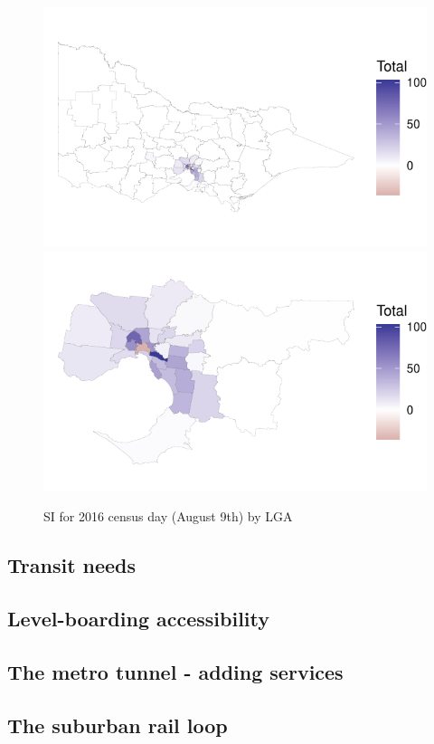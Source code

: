 \documentclass[]{tufte-book}
\begin{document}
\begin{figure}
\includegraphics[width=0.5\linewidth]{Reynolds_Currie_2024_transit_supply_index_GTFS_files/figure-latex/Victoria_SI_changes-1} \includegraphics[width=0.5\linewidth]{Reynolds_Currie_2024_transit_supply_index_GTFS_files/figure-latex/Victoria_SI_changes-2} \caption[SI for 2016 census day (August 9th) by LGA]{SI for 2016 census day (August 9th) by LGA}\label{fig:Victoria_SI_changes}
\end{figure}

\hypertarget{transit-needs}{%
\subsection{Transit needs}\label{transit-needs}}

\hypertarget{level-boarding-accessibility}{%
\subsection{Level-boarding
accessibility}\label{level-boarding-accessibility}}

\hypertarget{the-metro-tunnel---adding-services}{%
\subsection{The metro tunnel - adding
services}\label{the-metro-tunnel---adding-services}}

\hypertarget{the-suburban-rail-loop}{%
\subsection{The suburban rail loop}\label{the-suburban-rail-loop}}
\end{document}
